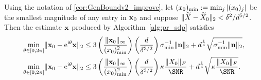 
\begin{corollary}
Using the notation of \cref{cor:GenBoundv2_improve}, let $(x_0)_{\rm min} := \min_j |(x_0)_j|$ be the smallest magnitude of any entry in $\mathbf{x}_0$ and suppose $\lVert\widetilde{X} - \widetilde{X}_0\rVert_2 < \delta^2 / d^{5/2}$.  Then the estimate $\mathbf{x}$ produced by Algorithm~\ref{alg:pr_sdp} satisfies 
\begin{equation}
  \begin{aligned}
    \mintheta \norm{\x_0 - \eit \x}_2 &\leq 3 \left( \frac{\norm{\x_0}_{\infty}}{(x_0)^2_{\rm min}} \right) \left(\frac{d}{\delta^{3/2}} \right) \sigma_{\min}^{-1}\norm{\n}_2 + d^{\frac{1}{4}} \sqrt{\sigma_{\min}^{-1}\norm{\n}_2}, \\    
    \mintheta \norm{\x_0 - \eit \x}_2 &\leq 3 \left( \frac{\norm{\x_0}_{\infty}}{(x_0)^2_{\rm min}} \right) \left(\frac{d}{\delta^{3/2}} \right) \kappa \frac{\norm{X_0}_F}{\SNR} + d^{\frac{1}{4}} \sqrt{\kappa \frac{\norm{X_0}_F}{\SNR}}.
  \end{aligned}
  \label{eq:main_improve}
\end{equation}
\label{cor:main_improve}
\end{corollary}

